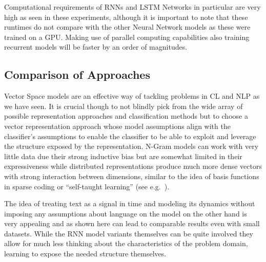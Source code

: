 Computational requirements of \glspl{RNN} and LSTM Networks in particular are very high as seen in these experiments, although it is important to note that these runtimes do not compare with the other Neural Network models as these were trained on a \gls{GPU}. Making use of parallel computing capabilities also training recurrent models will be faster by an order of magnitudes.

\subsection{Comparison of Approaches}

Vector Space models are an effective way of tackling problems in \gls{CL} and \gls{NLP} as we have seen. It is crucial though to not blindly pick from the wide array of possible representation approaches and classification methods but to choose a vector representation approach whose model assumptions align with the classifier's assumptions to enable the classifier to be able to exploit and leverage the structure exposed by the representation. N-Gram models can work with very little data due their strong inductive bias but are somewhat limited in their expressiveness while distributed representations produce much more dense vectors with strong interaction between dimensions, similar to the idea of basis functions in sparse coding or ``self-taught learning'' (see e.g.~\cite{Raina:2007aa}).

The idea of treating text as a signal in time and modeling its dynamics without imposing any assumptions about language on the model on the other hand is very appealing and as shown here can lead to comparable results even with small datasets. While the \gls{RNN} model variants themselves can be quite involved they allow for much less thinking about the characteristics of the problem domain, learning to expose the needed structure themselves.
